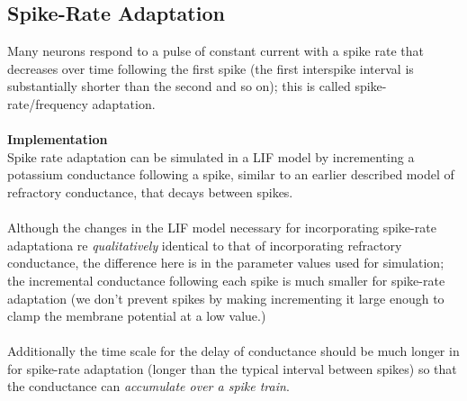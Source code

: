 \documentclass{report}
\begin{document}
\subsection{Spike-Rate Adaptation}
Many neurons respond to a pulse of constant current with a spike rate that decreases over time following the first spike (the first interspike interval is substantially shorter than the second and so on); this is called spike-rate/frequency adaptation.\\
\vspace{1mm}\\
\textbf{Implementation}\\
Spike rate adaptation can be simulated in a LIF model by incrementing a potassium conductance following a spike, similar to an earlier described model of refractory conductance, that decays between spikes.\\
\vspace{1mm}\\
Although the changes in the LIF model necessary for incorporating spike-rate adaptationa re \textit{qualitatively} identical to that of incorporating refractory conductance, 
the difference here is in the parameter values used for simulation; the incremental conductance following each spike is much smaller for spike-rate adaptation (we don't prevent spikes by making incrementing it large enough to clamp the membrane potential at a low value.)\\
\vspace{1mm}\\
Additionally the time scale for the delay of conductance should be much longer in for spike-rate adaptation (longer than the typical interval between spikes) so that the 
conductance can \textit{accumulate over a spike train}.
\newpage
\end{document}

